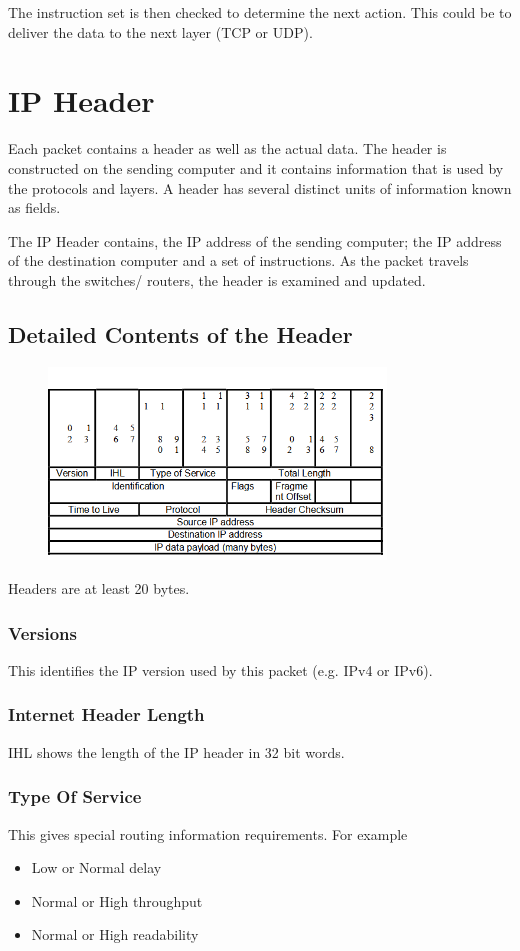 The instruction set is then checked to determine the next action. This could be to deliver the data to the next layer (TCP or UDP).

\section*{IP Header}
Each packet contains a header as well as the actual data. The header is constructed on the sending computer and it contains information that is used by the protocols and layers. A header has several distinct units of information known as fields.

The IP Header contains, the IP address of the sending computer; the IP address of the destination computer and a set of instructions. As the packet travels through the switches/ routers, the header is examined and updated. 
\subsection*{Detailed Contents of the Header}
\begin{figure}[H]
    \centering
    \includegraphics[width=0.8\textwidth]{assets/packet-header.png}
\end{figure}
Headers are at least 20 bytes.
\subsubsection*{Versions}
This identifies the IP version used by this packet (e.g. IPv4 or IPv6).
\subsubsection*{Internet Header Length}
IHL shows the length of the IP header in 32 bit words.
\subsubsection*{Type Of Service}
This gives special routing information requirements. For example
\begin{itemize}
    \item Low or Normal delay
    \item Normal or High throughput
    \item Normal or High readability
\end{itemize}
